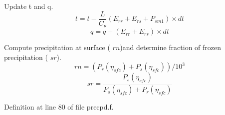 \begin{DoxyEnumerate}
\begin{DoxyItemize}
\item Update t and q. \[ t=t-\frac{L}{C_{p}}(E_{rr}+E_{rs}+P_{sm1})\times dt \] \[ q=q+(E_{rr}+E_{rs})\times dt \]
\end{DoxyItemize}
\item Compute precipitation at surface ( $rn$)and determine fraction of frozen precipitation ( $sr$). \[ rn= (P_{r}(\eta_{sfc})+P_{s}(\eta_{sfc}))/10^3 \] \[ sr=\frac{P_{s}(\eta_{sfc})}{P_{s}(\eta_{sfc})+P_{r}(\eta_{sfc})} \] 
\end{DoxyEnumerate}

Definition at line 80 of file precpd.\+f.

